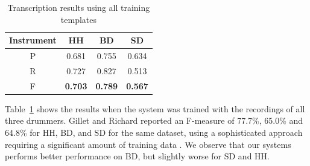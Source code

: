 \documentclass{article}
\newcommand{\tabref}[1]{\mbox{Table~\ref{#1}}}
\begin{document}
\begin{table}[ht]
\begin{footnotesize}
\begin{center}
\begin{tabular}{|c|c|c|c|}
\hline
Instrument & HH             & BD             & SD             \\ \hline
P          & 0.681          & 0.755          & 0.634          \\ \hline
R          & 0.727          & 0.827          & 0.513          \\ \hline
F          & \textbf{0.703} & \textbf{0.789} & \textbf{0.567} \\ \hline
\end{tabular}
\end{center}
\caption{Transcription results using all training templates}
\label{tab:basicResults}
\end{footnotesize}
\end{table}
  
\tabref{tab:basicResults} shows the results when the system was trained with the recordings of all three drummers.
Gillet and Richard reported an F-measure of 77.7\%, 65.0\% and 64.8\% for HH, BD, and SD for the same dataset, using a sophisticated approach requiring a significant amount of training data \cite{gillet_transcription_2008}. We observe that our systems performs better performance on BD, but slightly worse for SD and HH. 
\end{document}

